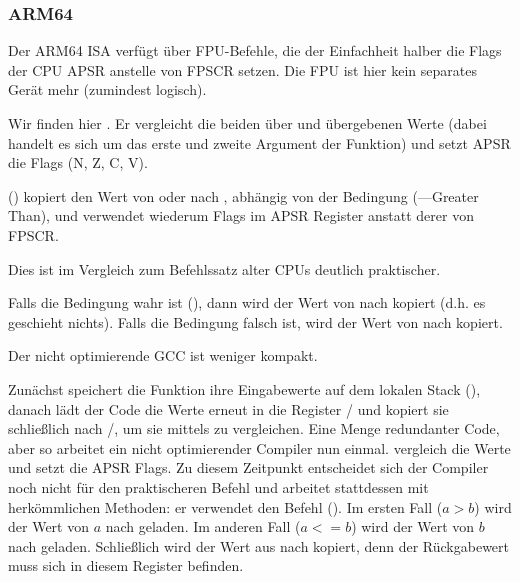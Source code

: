 \subsubsection{ARM64}



Der ARM64 \ac{ISA} verfügt über FPU-Befehle, die der Einfachheit halber die Flags der CPU \ac{APSR} anstelle von
\ac{FPSCR} setzen.
Die \ac{FPU} ist hier kein separates Gerät mehr (zumindest logisch).

Wir finden hier . Er vergleicht die beiden über  und  übergebenen Werte (dabei handelt es
sich um das erste und zweite Argument der Funktion) und setzt \ac{APSR} die Flags (N, Z, C, V).

 () kopiert den Wert von  oder  nach , abhängig von
der Bedingung (---Greater Than), und verwendet wiederum Flags im \ac{APSR} Register anstatt derer von
\ac{FPSCR}.

Dies ist im Vergleich zum Befehlssatz alter CPUs deutlich praktischer.

Falls die Bedingung wahr ist (), dann wird der Wert von  nach  kopiert (d.h. es geschieht
nichts).
Falls die Bedingung falsch ist, wird der Wert von  nach  kopiert.



Der nicht optimierende GCC ist weniger kompakt.

Zunächst speichert die Funktion ihre Eingabewerte auf dem lokalen Stack (), danach lädt der Code
die Werte erneut in die Register / und kopiert sie schließlich nach /, um sie mittels
 zu vergleichen.
Eine Menge redundanter Code, aber so arbeitet ein nicht optimierender Compiler nun einmal.
 vergleich die Werte und setzt die \ac{APSR} Flags.
Zu diesem Zeitpunkt entscheidet sich der Compiler noch nicht für den praktischeren  Befehl und arbeitet
stattdessen mit herkömmlichen Methoden:
er verwendet den  Befehl ().
Im ersten Fall ($a>b$) wird der Wert von $a$ nach  geladen. 
Im anderen Fall ($a<=b$) wird der Wert von $b$ nach  geladen.
Schließlich wird der Wert aus  nach  kopiert, denn der Rückgabewert muss sich in diesem Register
befinden.


